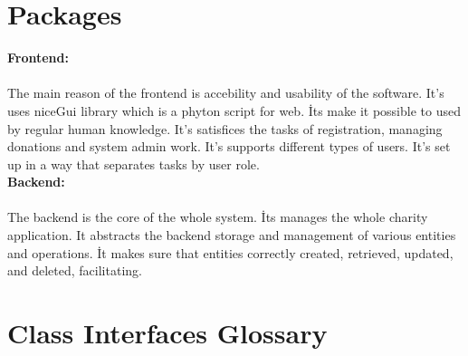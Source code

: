 \documentclass[a4paper,12pt]{report}
\begin{document}
		\section{Packages}
		
		\textbf{Frontend:}
		
			\paragraph{  }  The main reason of the frontend is accebility and usability of the software. It's uses niceGui library which is a phyton script for web. İts make it possible to used by regular human knowledge. It's satisfices the tasks of registration, managing donations and system admin work. It's supports different types of users. It's set up in a way that separates tasks by user role.  \\
			
				\textbf{Backend:}
					\paragraph{ } The backend is the core of the whole system. İts manages the whole charity application. It abstracts the backend storage and management of various entities and operations. İt makes sure that entities correctly created, retrieved, updated, and deleted, facilitating. 
				
		
		\section{Class Interfaces Glossary}
		
\end{document}
